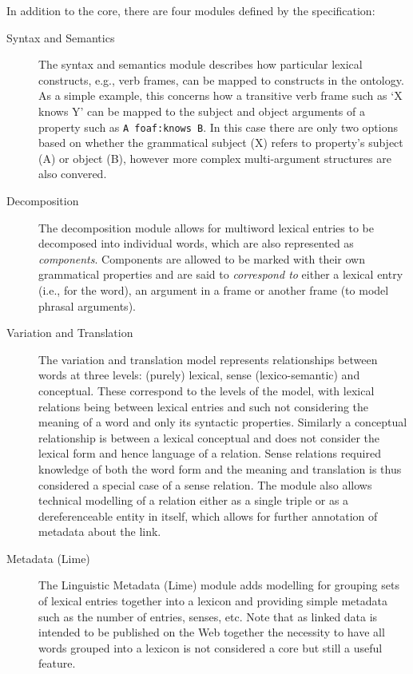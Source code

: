 \documentclass[12pt,a4paper]{elex2017}
\begin{document}
In addition to the core, there are four modules defined by the specification:

\begin{description}
    \item[Syntax and Semantics] The syntax and semantics module describes how
        particular lexical constructs, e.g., verb frames, can be mapped to
        constructs in the ontology. As a simple example, this concerns how a
        transitive verb frame such as `X knows Y' can be mapped to the subject
        and object arguments of a property such as \texttt{A foaf:knows B}. In this
        case there are only two options based on whether the grammatical subject
        (X) refers to property's subject (A) or object (B), however more complex
        multi-argument structures are also convered.
    \item[Decomposition] The decomposition module allows for multiword lexical
        entries to be decomposed into individual words, which are also
        represented as \emph{components}. Components are allowed to be marked
        with their own grammatical properties and are said to \emph{correspond
        to} either a lexical entry (i.e., for the word), an argument in a frame
        or another frame (to model phrasal arguments). 
    \item[Variation and Translation] The variation and translation model
        represents relationships between words at three levels: (purely)
        lexical, sense (lexico-semantic) and conceptual. These correspond
        to the levels of the model, with lexical relations being between lexical
        entries and such not considering the meaning of a word and only its
        syntactic properties. Similarly a conceptual relationship is between a
        lexical conceptual and does not consider the lexical form and hence
        language of a relation. Sense relations required knowledge of
        both the word form and the meaning and translation is thus considered a
        special case of a sense relation. The module also allows technical
        modelling of a relation either as a single triple or as a
        dereferenceable entity in itself, which allows for further annotation of
        metadata about the link.
    \item[Metadata (Lime)] The Linguistic Metadata (Lime) module adds modelling
        for grouping sets of lexical entries together into a lexicon and
        providing simple metadata such as the number of entries, senses, etc.
        Note that as linked data is intended to be published on the Web together
        the necessity to have all words grouped into a lexicon is not considered
        a core but still a useful feature.
\end{description}
\end{document}
